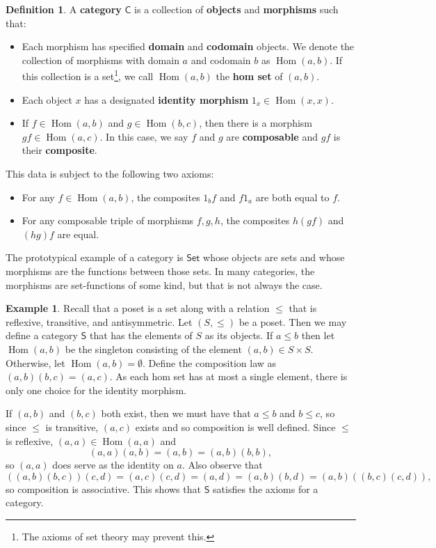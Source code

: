 \documentclass[MS, xcolor=dvipsnames]{wfuthesis}
\def\sC{\mathsf{C}}
\DeclareMathOperator{\Hom}{Hom}
\theoremstyle{definition}
\newtheorem{definition}[theorem]{Definition}
\newtheorem{example}[theorem]{Example}
\begin{document}
\begin{definition}
  A \textbf{category} $\sC$ is a collection of \textbf{objects} and \textbf{morphisms} such that:
  \begin{itemize}
    \item Each morphism has specified \textbf{domain} and \textbf{codomain} objects. We denote the collection of morphisms with domain $a$ and codomain $b$ as $\Hom(a,b)$. If this collection is a set\footnote{The axioms of set theory may prevent this.}, we call $\Hom(a,b)$ the \textbf{hom set} of $(a,b)$.
    \item Each object $x$ has a designated \textbf{identity morphism} $1_x \in \Hom(x,x)$.
    \item If $f \in \Hom(a,b)$ and $g \in \Hom(b,c)$, then there is a morphism $gf \in \Hom(a,c)$. In this case, we say $f$ and $g$ are \textbf{composable} and $gf$ is their \textbf{composite}.
  \end{itemize}
  This data is subject to the following two axioms:
  \begin{itemize}
    \item For any $f \in \Hom(a,b)$, the composites $1_bf$ and $f1_a$ are both equal to $f$.
    \item For any composable triple of morphisms $f,g,h$, the composites $h(gf)$ and $(hg)f$ are equal.
  \end{itemize}
\end{definition}
The prototypical example of a category is $\mathsf{Set}$ whose objects are sets and whose morphisms are the functions between those sets. In many categories, the morphisms are set-functions of some kind, but that is not always the case.
\begin{example}
  Recall that a poset is a set along with a relation $\le$ that is reflexive, transitive, and antisymmetric. Let $(S,\le)$ be a poset. Then we may define a category $\mathsf S$ that has the elements of $S$ as its objects. If $a \le b$ then let $\Hom(a,b)$ be the singleton consisting of the element $(a,b) \in S \times S$. Otherwise, let $\Hom(a,b)=\emptyset$. Define the composition law as $(a,b)(b,c)=(a,c)$. As each hom set has at most a single element, there is only one choice for the identity morphism. \par
  If $(a,b)$ and $(b,c)$ both exist, then we must have that $a \le b$ and $b \le c$, so since $\le$ is transitive, $(a,c)$ exists and so composition is well defined. Since $\le$ is reflexive, $(a,a) \in \Hom(a,a)$ and
  \[ (a,a)(a,b) = (a,b) = (a,b)(b,b), \]
  so $(a,a)$ does serve as the identity on $a$. Also observe that
  \[ ((a,b)(b,c))(c,d) = (a,c)(c,d) = (a,d) = (a,b)(b,d) = (a,b)((b,c)(c,d)), \]
  so composition is associative. This shows that $\mathsf S$ satisfies the axioms for a category.
\end{example}
\end{document}

